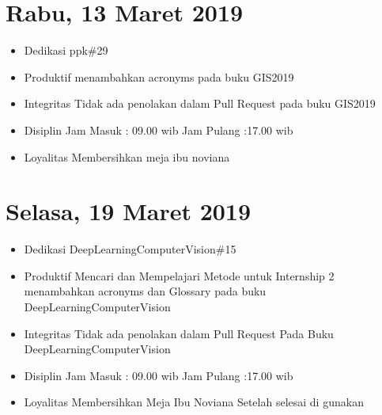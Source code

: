\section{Rabu, 13 Maret 2019}
\begin{itemize}
\item Dedikasi
\subitem ppk\#29
\item Produktif
  \subitem menambahkan acronyms pada buku GIS2019
\item Integritas
  \subitem Tidak ada penolakan dalam Pull Request pada buku GIS2019
\item Disiplin
  \subitem Jam Masuk : 09.00 wib
  \subitem Jam Pulang :17.00 wib
\item Loyalitas
  \subitem Membersihkan meja ibu noviana
\end{itemize} 

\section{Selasa, 19 Maret 2019}
\begin{itemize}
\item Dedikasi
\subitem DeepLearningComputerVision\#15
\item Produktif
  \subitem Mencari dan Mempelajari Metode untuk Internship 2
  \subitem menambahkan acronyms dan Glossary pada buku DeepLearningComputerVision
\item Integritas
  \subitem Tidak ada penolakan dalam Pull Request Pada Buku DeepLearningComputerVision
\item Disiplin
  \subitem Jam Masuk : 09.00 wib
  \subitem Jam Pulang :17.00 wib
\item Loyalitas
  \subitem Membersihkan Meja Ibu Noviana Setelah selesai di gunakan
\end{itemize} 